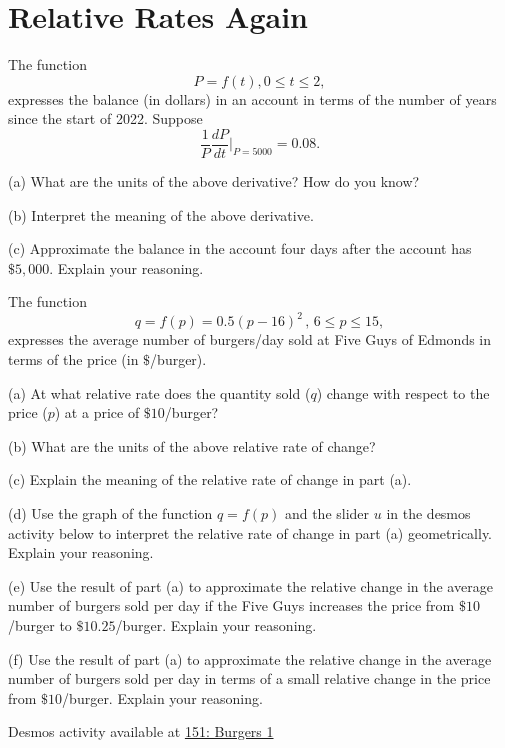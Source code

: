 \documentclass{ximera}
\begin{document}
\section*{Relative Rates Again}

\begin{question}   \label{Q45fggfbhyhy}
The function
\[
     P = f(t) , 0\leq t \leq 2,
\]
expresses the balance (in dollars) in an account in terms of the number of years since the start of 2022. Suppose 
\[
      \frac{1}{P} \frac{dP}{dt} \Big|_{P=5000} = 0.08 .
\]

(a) What are the units of the above derivative? How do you know?

(b) Interpret the meaning of the above derivative.

(c) Approximate the balance in the account four days after the account has $\$5,000$. Explain your reasoning.

\end{question}


\begin{question}  \label{Qe5r54tggrgtre}
The function 
\[
    q = f(p) = 0.5(p-16)^2 \, , \, 6\leq p \leq 15 , 
\]
expresses the average number of burgers/day sold at Five Guys of Edmonds in terms of the price (in $\$$/burger).

(a) At what relative rate does the quantity sold ($q$) change with respect to the price ($p$) at a price of $\$10$/burger?

(b) What are the units of the above relative rate of change?

(c) Explain the meaning of the relative rate of change in part (a).

(d) Use the graph of the function $q=f(p)$ and the slider $u$ in the desmos activity below to interpret the relative rate of change in part (a) geometrically. Explain your reasoning.

(e) Use the result of part (a) to approximate the relative change in the average number of burgers sold per day if the Five Guys increases the price from $\$10$/burger to $\$10.25$/burger. Explain your reasoning.

(f) Use the result of part (a) to approximate the relative change in the average number of burgers sold per day in terms of a small relative change in the price from $\$10$/burger. Explain your reasoning.


\begin{onlineOnly}
    \begin{center}
\end{center}
\end{onlineOnly}


Desmos activity available at \href{https://www.desmos.com/calculator/ylgk03oaza}{151: Burgers 1}

\end{question}
\end{document}
